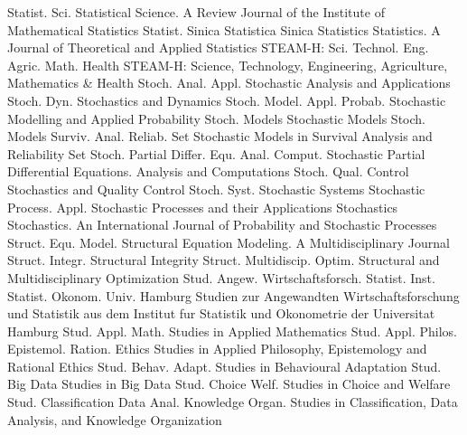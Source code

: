 {Statist. Sci.}
{Statistical Science. A Review Journal of the Institute of Mathematical Statistics}
{Statist. Sinica}
{Statistica Sinica}
{Statistics}
{Statistics. A Journal of Theoretical and Applied Statistics}
{STEAM-H: Sci. Technol. Eng. Agric. Math. Health}
{STEAM-H: Science, Technology, Engineering, Agriculture, Mathematics & Health}
{Stoch. Anal. Appl.}
{Stochastic Analysis and Applications}
{Stoch. Dyn.}
{Stochastics and Dynamics}
{Stoch. Model. Appl. Probab.}
{Stochastic Modelling and Applied Probability}
{Stoch. Models}
{Stochastic Models}
{Stoch. Models Surviv. Anal. Reliab. Set}
{Stochastic Models in Survival Analysis and Reliability Set}
{Stoch. Partial Differ. Equ. Anal. Comput.}
{Stochastic Partial Differential Equations. Analysis and Computations}
{Stoch. Qual. Control}
{Stochastics and Quality Control}
{Stoch. Syst.}
{Stochastic Systems}
{Stochastic Process. Appl.}
{Stochastic Processes and their Applications}
{Stochastics}
{Stochastics. An International Journal of Probability and Stochastic Processes}
{Struct. Equ. Model.}
{Structural Equation Modeling. A Multidisciplinary Journal}
{Struct. Integr.}
{Structural Integrity}
{Struct. Multidiscip. Optim.}
{Structural and Multidisciplinary Optimization}
{Stud. Angew. Wirtschaftsforsch. Statist. Inst. Statist. Okonom. Univ. Hamburg}
{Studien zur Angewandten Wirtschaftsforschung und Statistik aus dem Institut fur Statistik und Okonometrie der Universitat Hamburg}
{Stud. Appl. Math.}
{Studies in Applied Mathematics}
{Stud. Appl. Philos. Epistemol. Ration. Ethics}
{Studies in Applied Philosophy, Epistemology and Rational Ethics}
{Stud. Behav. Adapt.}
{Studies in Behavioural Adaptation}
{Stud. Big Data}
{Studies in Big Data}
{Stud. Choice Welf.}
{Studies in Choice and Welfare}
{Stud. Classification Data Anal. Knowledge Organ.}
{Studies in Classification, Data Analysis, and Knowledge Organization}
